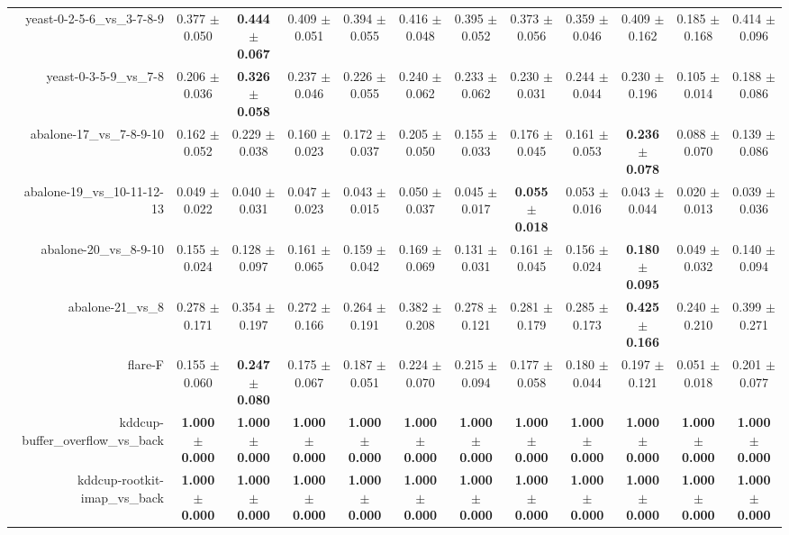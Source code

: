 \begin{table}[!ht]
{\begin{tabular}{r c c c c c c c c c c c}
yeast-0-2-5-6\_vs\_3-7-8-9 & 0.377 $\pm$ 0.050 & \textbf{0.444 $\pm$ 0.067} & 0.409 $\pm$ 0.051 & 0.394 $\pm$ 0.055 & 0.416 $\pm$ 0.048 & 0.395 $\pm$ 0.052 & 0.373 $\pm$ 0.056 & 0.359 $\pm$ 0.046 & 0.409 $\pm$ 0.162 & 0.185 $\pm$ 0.168 & 0.414 $\pm$ 0.096 \\
yeast-0-3-5-9\_vs\_7-8 & 0.206 $\pm$ 0.036 & \textbf{0.326 $\pm$ 0.058} & 0.237 $\pm$ 0.046 & 0.226 $\pm$ 0.055 & 0.240 $\pm$ 0.062 & 0.233 $\pm$ 0.062 & 0.230 $\pm$ 0.031 & 0.244 $\pm$ 0.044 & 0.230 $\pm$ 0.196 & 0.105 $\pm$ 0.014 & 0.188 $\pm$ 0.086 \\
abalone-17\_vs\_7-8-9-10 & 0.162 $\pm$ 0.052 & 0.229 $\pm$ 0.038 & 0.160 $\pm$ 0.023 & 0.172 $\pm$ 0.037 & 0.205 $\pm$ 0.050 & 0.155 $\pm$ 0.033 & 0.176 $\pm$ 0.045 & 0.161 $\pm$ 0.053 & \textbf{0.236 $\pm$ 0.078} & 0.088 $\pm$ 0.070 & 0.139 $\pm$ 0.086 \\
abalone-19\_vs\_10-11-12-13 & 0.049 $\pm$ 0.022 & 0.040 $\pm$ 0.031 & 0.047 $\pm$ 0.023 & 0.043 $\pm$ 0.015 & 0.050 $\pm$ 0.037 & 0.045 $\pm$ 0.017 & \textbf{0.055 $\pm$ 0.018} & 0.053 $\pm$ 0.016 & 0.043 $\pm$ 0.044 & 0.020 $\pm$ 0.013 & 0.039 $\pm$ 0.036 \\
abalone-20\_vs\_8-9-10 & 0.155 $\pm$ 0.024 & 0.128 $\pm$ 0.097 & 0.161 $\pm$ 0.065 & 0.159 $\pm$ 0.042 & 0.169 $\pm$ 0.069 & 0.131 $\pm$ 0.031 & 0.161 $\pm$ 0.045 & 0.156 $\pm$ 0.024 & \textbf{0.180 $\pm$ 0.095} & 0.049 $\pm$ 0.032 & 0.140 $\pm$ 0.094 \\
abalone-21\_vs\_8 & 0.278 $\pm$ 0.171 & 0.354 $\pm$ 0.197 & 0.272 $\pm$ 0.166 & 0.264 $\pm$ 0.191 & 0.382 $\pm$ 0.208 & 0.278 $\pm$ 0.121 & 0.281 $\pm$ 0.179 & 0.285 $\pm$ 0.173 & \textbf{0.425 $\pm$ 0.166} & 0.240 $\pm$ 0.210 & 0.399 $\pm$ 0.271 \\
flare-F & 0.155 $\pm$ 0.060 & \textbf{0.247 $\pm$ 0.080} & 0.175 $\pm$ 0.067 & 0.187 $\pm$ 0.051 & 0.224 $\pm$ 0.070 & 0.215 $\pm$ 0.094 & 0.177 $\pm$ 0.058 & 0.180 $\pm$ 0.044 & 0.197 $\pm$ 0.121 & 0.051 $\pm$ 0.018 & 0.201 $\pm$ 0.077 \\
kddcup-buffer\_overflow\_vs\_back & \textbf{1.000 $\pm$ 0.000} & \textbf{1.000 $\pm$ 0.000} & \textbf{1.000 $\pm$ 0.000} & \textbf{1.000 $\pm$ 0.000} & \textbf{1.000 $\pm$ 0.000} & \textbf{1.000 $\pm$ 0.000} & \textbf{1.000 $\pm$ 0.000} & \textbf{1.000 $\pm$ 0.000} & \textbf{1.000 $\pm$ 0.000} & \textbf{1.000 $\pm$ 0.000} & \textbf{1.000 $\pm$ 0.000} \\
kddcup-rootkit-imap\_vs\_back & \textbf{1.000 $\pm$ 0.000} & \textbf{1.000 $\pm$ 0.000} & \textbf{1.000 $\pm$ 0.000} & \textbf{1.000 $\pm$ 0.000} & \textbf{1.000 $\pm$ 0.000} & \textbf{1.000 $\pm$ 0.000} & \textbf{1.000 $\pm$ 0.000} & \textbf{1.000 $\pm$ 0.000} & \textbf{1.000 $\pm$ 0.000} & \textbf{1.000 $\pm$ 0.000} & \textbf{1.000 $\pm$ 0.000} \\

\end{tabular}}
\end{table}
